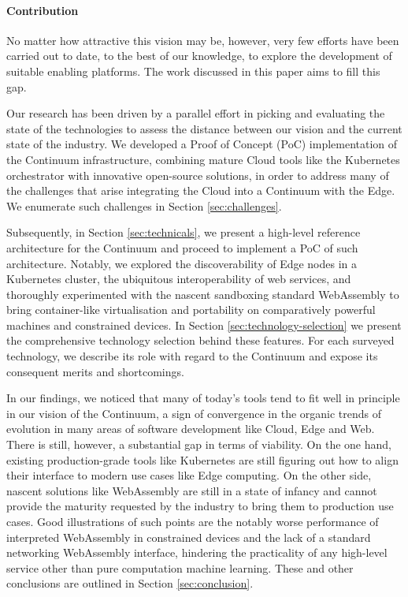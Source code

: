 \paragraph{Contribution}

No matter how attractive this vision may be, however, very few efforts have been carried out to date, to the best of our knowledge, to explore the development of suitable enabling platforms. The work discussed in this paper aims to fill this gap. 

Our research has been driven by a parallel effort in picking and evaluating the state of the technologies to assess the distance between our vision and the current state of the industry. We developed a Proof of Concept (PoC) implementation of the Continuum infrastructure, combining mature Cloud tools like the Kubernetes \cite{kubernetes} orchestrator with innovative open-source solutions, in order to address many of the challenges that arise integrating the Cloud into a Continuum with the Edge. We enumerate such challenges in Section \ref{sec:challenges}.

Subsequently, in Section \ref{sec:technicals}, we present a high-level reference architecture for the Continuum and proceed to implement a PoC of such architecture. Notably, we explored the discoverability of Edge nodes in a Kubernetes cluster, the ubiquitous interoperability of web services, and thoroughly experimented with the nascent sandboxing standard WebAssembly \cite{haas2017bringing} to bring container-like virtualisation and portability on comparatively powerful machines and constrained devices. In Section \ref{sec:technology-selection} we present the comprehensive technology selection behind these features. For each surveyed technology, we describe its role with regard to the Continuum and expose its consequent merits and shortcomings. 

In our findings, we noticed that many of today's tools tend to fit well in principle in our vision of the Continuum, a sign of convergence in the organic trends of evolution in many areas of software development like Cloud, Edge and Web. There is still, however, a substantial gap in terms of viability. On the one hand, existing production-grade tools like Kubernetes are still figuring out how to align their interface to modern use cases like Edge computing. On the other side, nascent solutions like WebAssembly are still in a state of infancy and cannot provide the maturity requested by the industry to bring them to production use cases. Good illustrations of such points are the notably worse performance of interpreted WebAssembly in constrained devices and the lack of a standard networking WebAssembly interface, hindering the practicality of any high-level service other than pure computation machine learning. These and other conclusions are outlined in Section \ref{sec:conclusion}.

